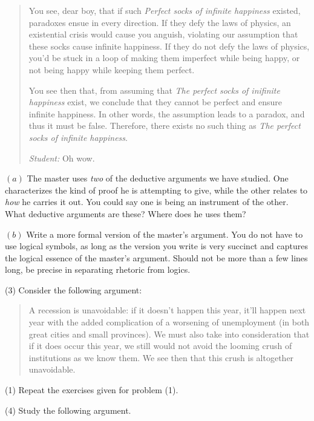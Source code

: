 \documentclass[a4paper, 12pt]{article}
\begin{document}
\begin{quote}
You see, dear boy, that if such \textit{Perfect socks of infinite happiness}
existed, paradoxes ensue in every direction. If they defy the laws of physics,
an existential crisis would cause you anguish, violating our assumption that
these socks cause infinite happiness. If they do not defy the laws of physics,
you'd be stuck in a loop of making them imperfect while being happy, or not
being happy while keeping them perfect. 

You see then that, from assuming that \textit{The perfect socks of inifinite
happiness} exist, we conclude that they cannot be perfect and ensure infinite
happiness. In other words, the assumption leads to a paradox, and thus it
must be false. Therefore, there exists no such thing as \textit{The perfect socks of 
infinite happiness}. 

\textit{Student:} Oh wow.

\end{quote}

$(a)$ The master uses \textit{two} of the deductive arguments we have studied.
One characterizes the kind of proof he is attempting to give, while the other
relates to \textit{how} he carries it out. You could say one is being an instrument 
of the other. What deductive arguments are these? Where does he uses them?

$(b)$ Write a more formal version of the master's argument. You do not have to
use logical symbols, as long as the version you write is very succinct and
captures the logical essence of the master's argument. Should not be more than 
a few lines long, be precise in separating rhetoric from logics.

\pagebreak 

(3) Consider the following argument: 

\begin{quote}
    A recession is unavoidable: if it doesn't happen this year, it'll happen
    next year with the added complication of a worsening of unemployment (in
    both great cities and small provinces). We must also take into
    consideration that if it does occur this year, we still would not avoid the
    looming crush of institutions as we know them. We see then that this crush
    is altogether unavoidable.
\end{quote}

(1) Repeat the exercises given for problem (1).

\pagebreak 

(4) Study the following argument.
\end{document}
